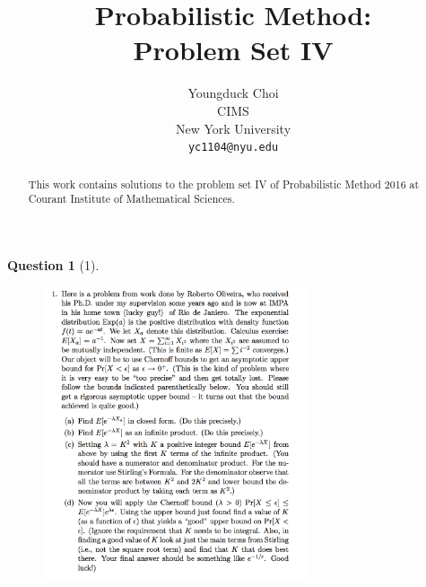 \documentclass{article} %
\title{Probabilistic Method: \\
Problem Set IV}
\author{
Youngduck Choi \\
CIMS \\
New York University\\
\texttt{yc1104@nyu.edu} \\
}
\theoremstyle{quest}
\newtheorem*{question}{Question}
\begin{document}
\maketitle

\begin{abstract}
This work contains solutions to the problem set IV
of Probabilistic Method 2016 at Courant Institute of Mathematical Sciences.
\end{abstract}

\bigskip

\begin{question}[1]
\hfill
\begin{figure}[h!]
  \centering
    \includegraphics[width=0.7\textwidth]{PM-4-1.png}
\end{figure}
\end{question}
\newpage
\end{document}
